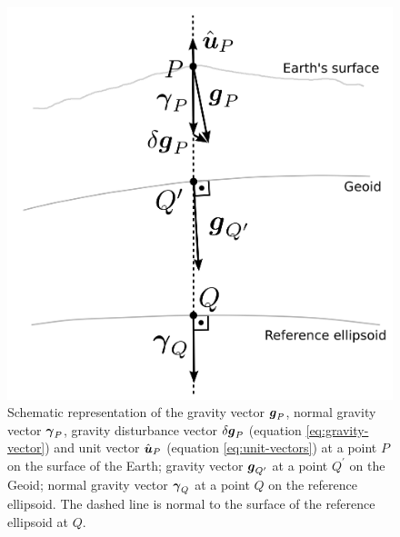 \documentclass[extra]{gji}
\begin{document}
\begin{figure}
    \includegraphics{figures/surfaces.png}
    \caption{Schematic representation of the gravity vector
        $\mitbf{g}_{P}$, normal gravity vector $\mitbf{\gamma}_{P}$,
        gravity disturbance vector $\delta \mitbf{g}_{P}$
        (equation \ref{eq:gravity-vector}) and unit vector 
        $\hat{\mitbf{u}}_{P}$ (equation \ref{eq:unit-vectors}) at a point $P$ on the surface of the Earth; gravity vector 
        $\mitbf{g}_{Q^{\prime}}$ at a point $Q^{\prime}$ on the Geoid;
        normal gravity vector $\mitbf{\gamma}_{Q}$ at a point $Q$ on
        the reference ellipsoid. The dashed line is normal to the 
        surface of the reference ellipsoid at $Q$.}
  \label{fig:surfaces}
\end{figure}

\label{lastpage}
\end{document}
